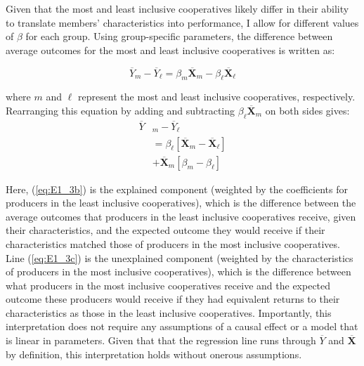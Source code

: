 \documentclass[11pt]{article}
\begin{document}
Given that the most and least inclusive cooperatives likely differ in their ability to translate members' characteristics into performance, I allow for different values of $\beta$ for each group. Using group-specific parameters, the difference between average outcomes for the most and least inclusive cooperatives is written as:

\begin{equation} \label{eq:E1_2}
        \overline{Y}_{m} - \overline{Y}_{\ell} =  \beta_{m}\overline{\mathbf{X}}_{m} - \beta_{\ell}\overline{\mathbf{X}}_{\ell}
\end{equation}  

where $m$ and $\ell$ represent the most and least inclusive cooperatives, respectively. Rearranging this equation by adding and subtracting $\beta_{\ell}\overline{\mathbf{X}}_{m}$ on both sides gives:
\begin{subequations}
    \begin{align}
        \overline{Y}&_{m} - \overline{Y}_{\ell} \label{eq:E1_3a} \\
                &= \beta_{\ell}[\overline{\mathbf{X}}_{m} - \overline{\mathbf{X}}_{\ell}] \label{eq:E1_3b} \\
                &+ \overline{\mathbf{X}}_{m}[\beta_{m} - \beta_{\ell}] \label{eq:E1_3c}
    \end{align}
\end{subequations}  

Here, (\ref{eq:E1_3b}) is the explained component (weighted by the coefficients for producers in the least inclusive cooperatives), which is the difference between the average outcomes that producers in the least inclusive cooperatives receive, given their characteristics, and the expected outcome they would receive if their characteristics matched those of producers in the most inclusive cooperatives. %
Line (\ref{eq:E1_3c}) is the unexplained component (weighted by the characteristics of producers in the most inclusive cooperatives), which is the difference between what producers in the most inclusive cooperatives receive and the expected outcome these producers would receive if they had equivalent returns to their characteristics as those in the least inclusive cooperatives. Importantly, this interpretation does not require any assumptions of a causal effect or a model that is linear in parameters. Given that that the regression line runs through $\overline{Y}$ and $\overline{\mathbf{X}}$ by definition, this interpretation holds without onerous assumptions. 
\end{document}
